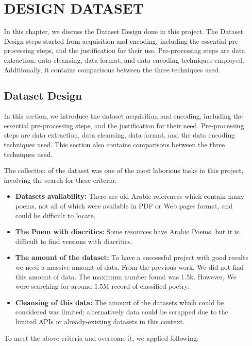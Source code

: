 \chapter{\uppercase{Design Dataset}}\label{Ch:Dataset}

In this chapter, we discuss the Dataset Design done in this project. The Dataset Design steps started from acquisition and encoding, including the essential pre-processing steps, and the justification for their use. Pre-processing steps are data extraction, data cleansing, data format, and data encoding techniques employed. Additionally, it contains comparisons between the three techniques used.

\clearpage

\section{Dataset Design}

In this section, we introduce the dataset acquisition and encoding, including the essential pre-processing steps, and the justification for their need. Pre-processing steps are data extraction, data cleansing, data format, and the data encoding techniques used. This section also contains comparisons between the three techniques used.

The collection of the dataset was one of the most laborious tasks in this project, involving the search for these criteria:

\begin{itemize}
 
 \item \textbf{Datasets availability:} There are old Arabic references which contain many poems, not all of which were available in PDF or Web pages format, and could be difficult to locate.
 
 \item \textbf{The Poem with diacritics:} Some resources have Arabic Poems, but it is difficult to find versions with diacritics.
 
 \item \textbf{The amount of the dataset:} To have a successful project with good results we need a massive amount of data. From the previous work, We did not find this amount of data. The maximum number found was 1.5k. However, We were searching for around 1.5M record of classified poetry.

 
 \item \textbf{Cleansing of this data:} The amount of the datasets which could be considered was limited; alternatively data could be scrapped due to the limited APIs or already-existing datasets in this context.
 
\end{itemize}
To meet the above criteria and overcome it, we applied following:

